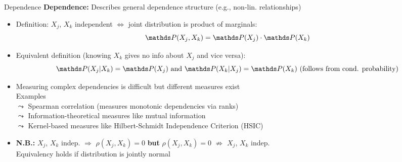 \documentclass[10pt,compress,t,notes=noshow, xcolor=table]{beamer}
\begin{document}
\begin{frame}{Dependence}
\textbf{Dependence:} Describes general dependence structure  (e.g., non-lin. relationships)

\begin{itemize}[<+->]
\item Definition: $X_j$, $X_k$ independent $\Leftrightarrow$ joint distribution is product of marginals:%
$$\P(X_j, X_k) = \P(X_j) \cdot \P(X_k)$$
\item Equivalent definition (knowing $X_k$ gives no info about $X_j$ and vice versa): 
$$\P(X_j|X_k) = \P(X_j) \text{ and } \P(X_k|X_j) = \P(X_k) \text{ (follows from cond. probability)}$$ 
\item Measuring complex dependencies is difficult but different measures exist\\ Examples \\
$\leadsto$ Spearman correlation (measures monotonic dependencies via ranks) \\
$\leadsto$ Information-theoretical measures like mutual information \\
$\leadsto$ Kernel-based measures like Hilbert-Schmidt Independence Criterion (HSIC) %
\item \textbf{N.B.:} $X_j$, $X_k$ indep. $\Rightarrow$ $\rho(X_j, X_k) = 0$ \textbf{but} $\rho(X_j, X_k) = 0$ $\nRightarrow$ $X_j$, $X_k$  indep. \\
Equivalency holds if distribution is jointly normal
\end{itemize}
\end{frame}
\end{document}
